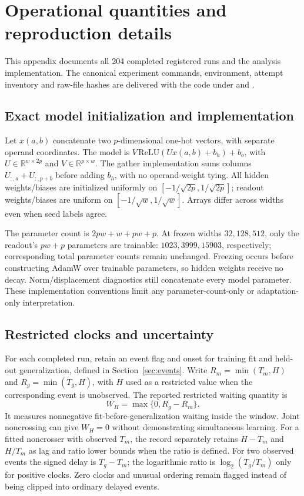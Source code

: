 \section{Operational quantities and reproduction details}
\label{app:details}
This appendix documents all 204 completed registered runs and the analysis implementation. The canonical experiment commands, environment, attempt inventory and raw-file hashes are delivered with the code under  and .

\subsection{Exact model initialization and implementation}
\label{app:implementation}
Let $x(a,b)$ concatenate two $p$-dimensional one-hot vectors, with separate operand coordinates. The model is $V\,\mathrm{ReLU}(Ux(a,b)+b_h)+b_o$, with $U\in\mathbb R^{w\times2p}$ and $V\in\mathbb R^{p\times w}$. The gather implementation sums columns $U_{:,a}+U_{:,p+b}$ before adding $b_h$, with no operand-weight tying. All hidden weights/biases are initialized uniformly on $[-1/\sqrt{2p},1/\sqrt{2p}]$; readout weights/biases are uniform on $[-1/\sqrt w,1/\sqrt w]$. Arrays differ across widths even when seed labels agree.

The parameter count is $2pw+w+pw+p$. At frozen widths $32,128,512$, only the readout's $pw+p$ parameters are trainable: $1023,3999,15903$, respectively; corresponding total parameter counts remain unchanged. Freezing occurs before constructing AdamW over trainable parameters, so hidden weights receive no decay. Norm/displacement diagnostics still concatenate every model parameter. These implementation conventions limit any parameter-count-only or adaptation-only interpretation.

\subsection{Restricted clocks and uncertainty}
\label{app:clocks}
For each completed run, retain an event flag and onset for training fit and held-out generalization, defined in Section~\ref{sec:events}. Write $R_m=\min(T_m,H)$ and $R_g=\min(T_g,H)$, with $H$ used as a restricted value when the corresponding event is unobserved. The reported restricted waiting quantity is
\begin{equation}
W_H=\max\{0,R_g-R_m\}.
\end{equation}
It measures nonnegative fit-before-generalization waiting inside the window. Joint noncrossing can give $W_H=0$ without demonstrating simultaneous learning. For a fitted noncrosser with observed $T_m$, the record separately retains $H-T_m$ and $H/T_m$ as lag and ratio lower bounds when the ratio is defined. For two observed events the signed delay is $T_g-T_m$; the logarithmic ratio is $\log_2(T_g/T_m)$ only for positive clocks. Zero clocks and unusual ordering remain flagged instead of being clipped into ordinary delayed events.

